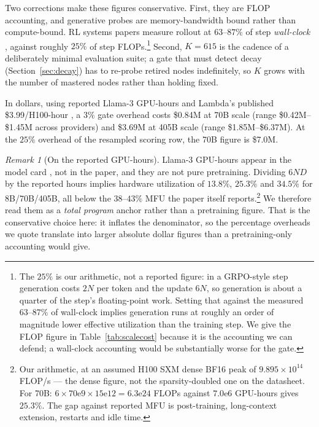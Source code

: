 \documentclass[11pt]{article}
\theoremstyle{plain}
\theoremstyle{definition}
\theoremstyle{remark}
\newtheorem*{remark}{Remark}
\begin{document}
Two corrections make these figures conservative. First, they are FLOP
accounting, and generative probes are memory-bandwidth bound rather than
compute-bound. RL systems papers measure rollout at $63$--$87\%$ of step
\emph{wall-clock} \citep{seer2025}, against roughly $25\%$ of step
FLOPs.\footnote{The $25\%$ is our arithmetic, not a reported figure: in a
GRPO-style step generation costs $2N$ per token and the update $6N$, so
generation is about a quarter of the step's floating-point work. Setting that
against the measured $63$--$87\%$ of wall-clock implies generation runs at
roughly an order of magnitude lower effective utilization than the training step.
We give the FLOP figure in Table~\ref{tab:scalecost} because it is the accounting
we can defend; a wall-clock accounting would be substantially worse for the
gate.} Second, $K = 615$ is the cadence of a deliberately minimal evaluation
suite; a gate that must detect decay (Section~\ref{sec:decay}) has to re-probe
retired nodes indefinitely, so $K$ grows with the number of mastered nodes rather
than holding fixed.

In dollars, using reported Llama-3 GPU-hours \citep{meta2024llama31card} and
Lambda's published \$3.99/H100-hour \citep{lambda2026pricing}, a $3\%$ gate
overhead costs \$0.84M at 70B scale (range \$0.42M--\$1.45M across providers) and
\$3.69M at 405B scale (range \$1.85M--\$6.37M). At the $25\%$ overhead of the
resampled scoring row, the 70B figure is \$7.0M.

\begin{remark}[On the reported GPU-hours]
Llama-3 GPU-hours appear in the model card \citep{meta2024llama31card}, not in
the paper, and they are not pure pretraining. Dividing $6ND$ by the reported
hours implies hardware utilization of $13.8\%$, $25.3\%$ and $34.5\%$ for
8B/70B/405B, all below the $38$--$43\%$ MFU the paper itself
reports.\footnote{Our arithmetic, at an assumed H100 SXM dense BF16 peak of
$9.895 \times 10^{14}$ FLOP/s --- the dense figure, not the sparsity-doubled one
on the datasheet. For 70B: $6 \times 70\mathrm{e}9 \times 15\mathrm{e}12 =
6.3\mathrm{e}24$ FLOPs against $7.0\mathrm{e}6$ GPU-hours gives $25.3\%$. The gap
against reported MFU is post-training, long-context extension, restarts and idle
time.} We therefore read them as a \emph{total program} anchor rather than a
pretraining figure. That is the conservative choice here: it inflates the
denominator, so the percentage overheads we quote translate into larger absolute
dollar figures than a pretraining-only accounting would give.
\end{remark}
\end{document}
